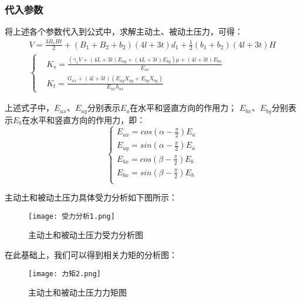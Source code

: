 \documentclass[withoutpreface,bwprint]{cumcmthesis}
\begin{document}
\subsubsection{代入参数}
将上述各个参数代入到公式中，求解主动土、被动土压力，可得：
    \begin{equation}
        \begin{array}{l} 
        V=\frac{3B_1Ht}{2}+(B_1+B_2+b_2) (4l+3t)d_1+\frac{1}{2}(b_1+b_2)(4l+3t)H\\[0.2cm]
            \left\{
            \begin{aligned}
                &K_s=\frac{(\gamma_1 V+(4L+3t)E_{ay}+(4L+3t)E_{by})\mu +(4l+3t)E_{bx}}{E_{ax}} \\
               &K_t = \frac{G_{ax} + (4l + 3t)(E_{ay}X_{ay} + E_{by}X_{by})}{E_{ax}h_{ax}}
            \end{aligned}
            \right.
        \end{array}
    \end{equation}
    \par
    上述式子中，$E_{ax}$、$E_{ay}$分别表示$E_{a}$在水平和竖直方向的作用力；
    $E_{bx}$、$E_{by}$分别表示$E_{b}$在水平和竖直方向的作用力，即：
    \begin{equation}
        \left\{\begin{matrix} 
            E_{ax}=cos(\alpha-\frac{\pi}{2})E_{a}\\
            E_{ay}=sin(\alpha-\frac{\pi}{2})E_{a}\\            
            E_{bx}=cos(\beta-\frac{\pi}{2})E_{b}\\            
            E_{bx}=sin(\beta-\frac{\pi}{2})E_{b}\\
        \end{matrix}\right.    
    \end{equation}

主动土和被动土压力具体受力分析如下图所示：


    \begin{figure}[H]
        \centering
        \texttt{[image: 受力分析1.png]}
        \caption{主动土和被动土压力受力分析图}
        \label{fig:主动土和被动土压力受力分析图}
    \end{figure}

    在此基础上，我们可以得到相关力矩的分析图：
    \begin{figure}[H]
    \centering
    \texttt{[image: 力矩2.png]}
    \caption{主动土和被动土压力力矩图}
    \label{fig:主动土和被动土压力力矩图}
    \end{figure}
\end{document}
